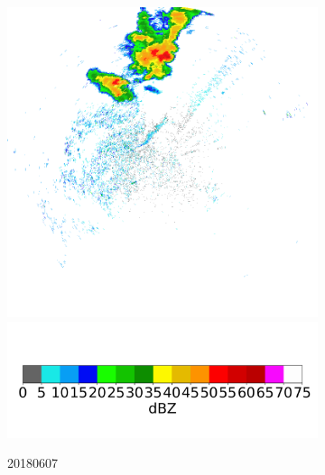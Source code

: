 \begin{figure}[ht]
\begin{subfigure}[b]{0.45\textwidth}
		\includegraphics[width=\textwidth]{./thesis_code/plots/midlothian-tx-20180607-233029-ref.png}
		\includegraphics[width=\textwidth]{./thesis_code/plots/dfw_colormap.png}
		\caption{20180607}
		\label{fig:classifying_datadiscovery_ex2}
	\end{subfigure}
	\begin{subfigure}[b]{0.45\textwidth}

\end{subfigure}
\end{figure}
